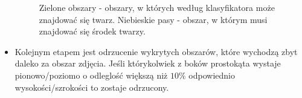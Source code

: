 \documentclass[10pt, a4paper]{article}
\begin{document}
\begin{itemize}
\begin{figure}[H]
\begin{center}
        \end{center}
        \caption{Zielone obszary - obszary, w których według klasyfikatora może znajdować się twarz. Niebieskie pasy - obszar, w którym musi znajdować się środek twarzy.}
        \label{fig:face_boundary}
    \end{figure}
    
    \item Kolejnym etapem jest odrzucenie wykrytych obszarów, które wychodzą zbyt daleko za obszar zdjęcia. Jeśli którykolwiek z boków prostokąta wystaje pionowo/poziomo o odleglość większą niż $10\%$ odpowiednio wysokości/szrokości to zostaje odrzucony.
    

\end{itemize}
\end{document}
